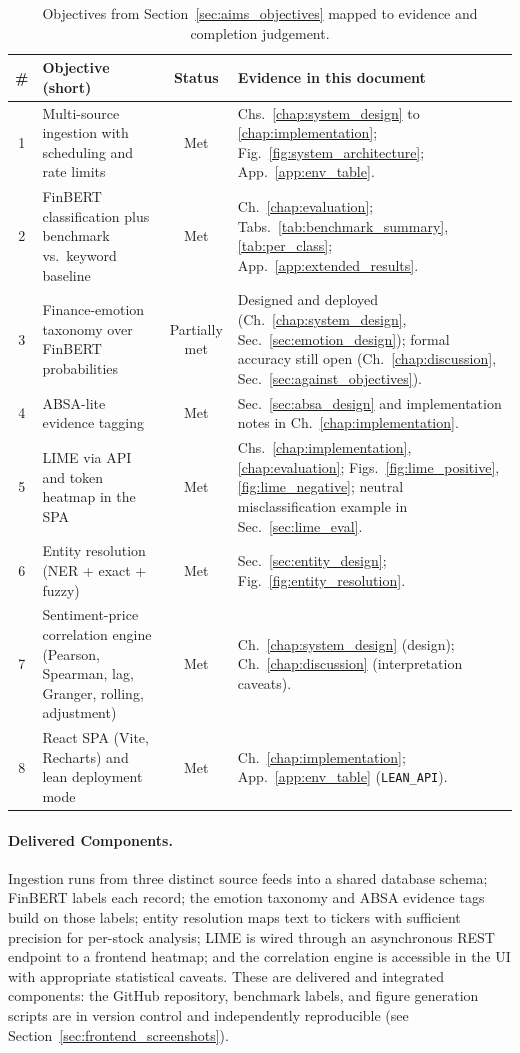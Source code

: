 \begin{table}[!ht]
\centering
\footnotesize
\setlength{\tabcolsep}{3.5pt}
\begin{tabularx}{\textwidth}{@{}c >{\raggedright\arraybackslash}X c >{\raggedright\arraybackslash}X@{}}
\toprule
\textbf{\#} & \textbf{Objective (short)} & \textbf{Status} & \textbf{Evidence in this document} \\
\midrule
1 & Multi-source ingestion with scheduling and rate limits & Met & Chs.~\ref{chap:system_design} to \ref{chap:implementation}; Fig.~\ref{fig:system_architecture}; App.~\ref{app:env_table}. \\
2 & FinBERT classification plus benchmark vs.\ keyword baseline & Met & Ch.~\ref{chap:evaluation}; Tabs.~\ref{tab:benchmark_summary}, \ref{tab:per_class}; App.~\ref{app:extended_results}. \\
3 & Finance-emotion taxonomy over FinBERT probabilities & Partially met & Designed and deployed (Ch.~\ref{chap:system_design}, Sec.~\ref{sec:emotion_design}); formal accuracy still open (Ch.~\ref{chap:discussion}, Sec.~\ref{sec:against_objectives}). \\
4 & ABSA-lite evidence tagging & Met & Sec.~\ref{sec:absa_design} and implementation notes in Ch.~\ref{chap:implementation}. \\
5 & LIME via API and token heatmap in the SPA & Met & Chs.~\ref{chap:implementation}, \ref{chap:evaluation}; Figs.~\ref{fig:lime_positive}, \ref{fig:lime_negative}; neutral misclassification example in Sec.~\ref{sec:lime_eval}. \\
6 & Entity resolution (NER + exact + fuzzy) & Met & Sec.~\ref{sec:entity_design}; Fig.~\ref{fig:entity_resolution}. \\
7 & Sentiment-price correlation engine (Pearson, Spearman, lag, Granger, rolling, adjustment) & Met & Ch.~\ref{chap:system_design} (design); Ch.~\ref{chap:discussion} (interpretation caveats). \\
8 & React SPA (Vite, Recharts) and lean deployment mode & Met & Ch.~\ref{chap:implementation}; App.~\ref{app:env_table} (\texttt{LEAN\_API}). \\
\bottomrule
\end{tabularx}
\caption{Objectives from Section~\ref{sec:aims_objectives} mapped to evidence and completion judgement.}
\label{tab:objectives_evidence}
\end{table}

\paragraph{Delivered Components.}
Ingestion runs from three distinct source feeds into a shared database schema; FinBERT labels each record; the emotion taxonomy and ABSA evidence tags build on those labels; entity resolution maps text to tickers with sufficient precision for per-stock analysis; LIME is wired through an asynchronous REST endpoint to a frontend heatmap; and the correlation engine is accessible in the UI with appropriate statistical caveats. These are delivered and integrated components: the GitHub repository, benchmark labels, and figure generation scripts are in version control and independently reproducible (see Section~\ref{sec:frontend_screenshots}).

